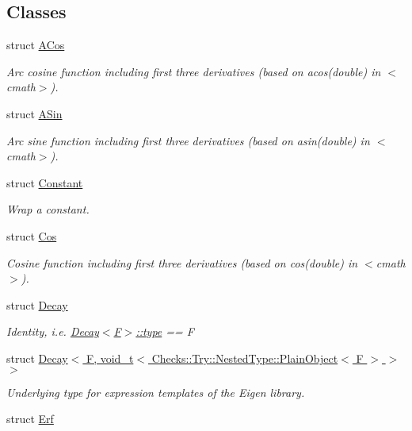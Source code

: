 \subsection*{Classes}
\begin{DoxyCompactItemize}
\item 
struct \hyperlink{structFunG_1_1ACos}{A\+Cos}
\begin{DoxyCompactList}\small\item\em Arc cosine function including first three derivatives (based on acos(double) in $<$cmath$>$). \end{DoxyCompactList}\item 
struct \hyperlink{structFunG_1_1ASin}{A\+Sin}
\begin{DoxyCompactList}\small\item\em Arc sine function including first three derivatives (based on asin(double) in $<$cmath$>$). \end{DoxyCompactList}\item 
struct \hyperlink{structFunG_1_1Constant}{Constant}
\begin{DoxyCompactList}\small\item\em Wrap a constant. \end{DoxyCompactList}\item 
struct \hyperlink{structFunG_1_1Cos}{Cos}
\begin{DoxyCompactList}\small\item\em Cosine function including first three derivatives (based on cos(double) in $<$cmath$>$). \end{DoxyCompactList}\item 
struct \hyperlink{structFunG_1_1Decay}{Decay}
\begin{DoxyCompactList}\small\item\em Identity, i.\+e. \hyperlink{structFunG_1_1Decay_a4b2916cbb7c8587ab3fccc9b896b9df4}{Decay$<$\+F$>$\+::type} == F \end{DoxyCompactList}\item 
struct \hyperlink{structFunG_1_1Decay_3_01F_00_01void__t_3_01Checks_1_1Try_1_1NestedType_1_1PlainObject_3_01F_01_4_01_4_01_4}{Decay$<$ F, void\+\_\+t$<$ Checks\+::\+Try\+::\+Nested\+Type\+::\+Plain\+Object$<$ F $>$ $>$ $>$}
\begin{DoxyCompactList}\small\item\em Underlying type for expression templates of the Eigen library. \end{DoxyCompactList}\item 
struct \hyperlink{structFunG_1_1Erf}{Erf}

\end{DoxyCompactItemize}
